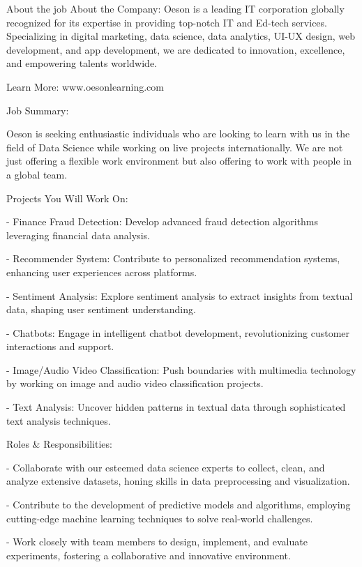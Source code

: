 About the job
About the Company: Oeson is a leading IT corporation globally recognized for its expertise in providing top-notch IT and Ed-tech services. Specializing in digital marketing, data science, data analytics, UI-UX design, web development, and app development, we are dedicated to innovation, excellence, and empowering talents worldwide.

Learn More: www.oesonlearning.com



Job Summary:



Oeson is seeking enthusiastic individuals who are looking to learn with us in the field of Data Science while working on live projects internationally. We are not just offering a flexible work environment but also offering to work with people in a global team.



Projects You Will Work On:



- Finance Fraud Detection: Develop advanced fraud detection algorithms leveraging financial data analysis.

- Recommender System: Contribute to personalized recommendation systems, enhancing user experiences across platforms.

- Sentiment Analysis: Explore sentiment analysis to extract insights from textual data, shaping user sentiment understanding.

- Chatbots: Engage in intelligent chatbot development, revolutionizing customer interactions and support.

- Image/Audio Video Classification: Push boundaries with multimedia technology by working on image and audio video classification projects.

- Text Analysis: Uncover hidden patterns in textual data through sophisticated text analysis techniques.



Roles & Responsibilities:


- Collaborate with our esteemed data science experts to collect, clean, and analyze extensive datasets, honing skills in data preprocessing and visualization.

- Contribute to the development of predictive models and algorithms, employing cutting-edge machine learning techniques to solve real-world challenges.

- Work closely with team members to design, implement, and evaluate experiments, fostering a collaborative and innovative environment.

